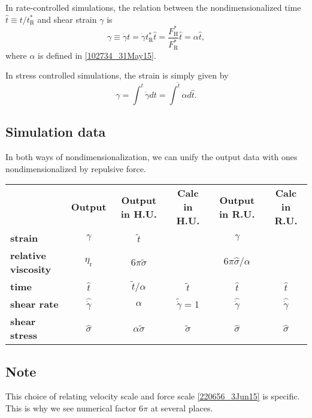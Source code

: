\documentclass[fontsize=11pt]{scrartcl}
\begin{document}
In rate-controlled simulations,
the relation between
the nondimensionalized time
$\hat{t} \equiv t /t_{\mathrm{R}}^{\ast}$
and shear strain $\gamma$ is
\begin{equation}
 \gamma
  \equiv \dot{\gamma} t 
  = \dot{\gamma} t_{\mathrm{R}}^{\ast} \hat{t} 
   = 
\frac{F_{\mathrm{H}}^{\ast}}{F_{\mathrm{R}}^{\ast}}
\hat{t} = \alpha \hat{t},
\end{equation}
where $\alpha$ is defined in \eqref{102734_31May15}.

In stress controlled simulations,
the strain is simply given by
\begin{equation}
 \gamma
 = \int^{t} \dot{\gamma} dt
 = \int^{\hat{t}} \alpha d\hat{t}.
\end{equation}

\subsection*{Simulation data}

In both ways of nondimensionalization,
we can unify the output data with ones nondimensionalized by repulsive force.

\begin{center}
  \begin{tabular}{lccccc}
    &   {\bf Output} & {\bf Output in H.U.} &  {\bf Calc in H.U.}
    & {\bf Output in R.U.} &  {\bf Calc in R.U.}
    \\
    {\bf strain} & $\gamma $ & $ \tilde{t}$
    & & $\gamma $
    \\
    {\bf relative viscosity}   &  $ \eta_{\mathrm{r}}$ &
    $6 \pi \tilde{\sigma}$ &  &
    $6 \pi \hat{\sigma}/\alpha$  & \\
    {\bf time}  & $\hat{t}$ & $ \tilde{t}/\alpha$
    &  $\tilde{t} $ & $\hat{t}$ & $\hat{t}$\\
    {\bf shear rate}& $\hat{\dot{\gamma}}$ & $\alpha$ & $\tilde{\dot{\gamma}} = 1$
    & $\hat{\dot{\gamma}}$ & $\hat{\dot{\gamma}}$  \\
    {\bf shear stress} & $\hat{\sigma}$
       & $\alpha\tilde{\sigma}$  & $\tilde{\sigma} $  &
      $\hat{\sigma}$ &  $\hat{\sigma}$ 
  \end{tabular} 
\end{center}


\subsection*{Note}

This choice of relating
velocity scale and force scale \eqref{220656_3Jun15}
is specific.
%
This is why
we see numerical factor $6\pi$ at several places.
\end{document}
